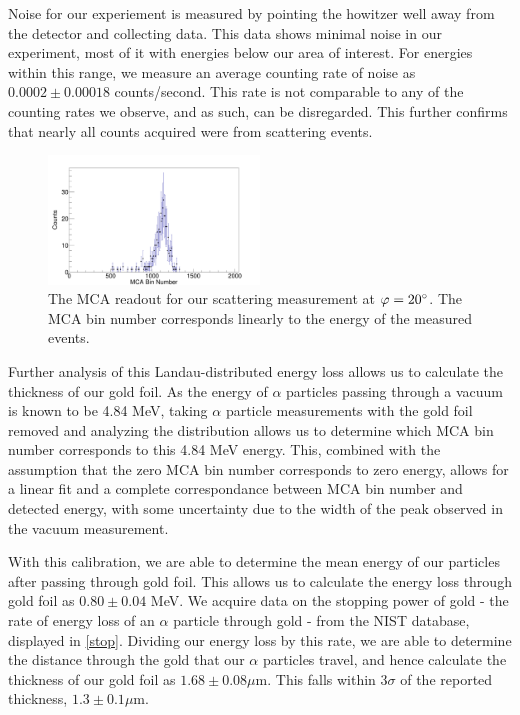    Noise for our experiement is measured by pointing the howitzer well away from the detector and collecting data. This data shows minimal noise in our experiment, most of it with energies below our area of interest. For energies within this range, we measure an average counting rate of noise as $0.0002 \pm 0.00018$ counts/second. This rate is not comparable to any of the counting rates we observe, and as such, can be disregarded. This further confirms that nearly all counts acquired were from scattering events.
   \begin{figure}[h]
     \includegraphics[width=0.5\textwidth]{mca_readout.png}
     \caption{The MCA readout for our scattering measurement at $\varphi = 20\degree$. The MCA bin number corresponds linearly to the energy of the measured events.}
     \label{mca}
   \end{figure}

   Further analysis of this Landau-distributed energy loss allows us to calculate the thickness of our gold foil. As the energy of $\alpha$ particles passing through a vacuum is known to be 4.84 MeV, taking $\alpha$ particle measurements with the gold foil removed and analyzing the distribution allows us to determine which MCA bin number corresponds to this 4.84 MeV  energy. This, combined with the assumption that the zero MCA bin number corresponds to zero energy, allows for a linear fit and a complete correspondance between MCA bin number and detected energy, with some uncertainty due to the width of the peak observed in the vacuum measurement. 

   With this calibration, we are able to determine the mean energy of our particles after passing through gold foil. This allows us to calculate the energy loss through gold foil as $0.80 \pm 0.04$ MeV. We acquire data on the stopping power of gold - the rate of energy loss of an $\alpha$ particle through gold - from the NIST database, displayed in \ref{stop}. Dividing our energy loss by this rate, we are able to determine the distance through the gold that our $\alpha$ particles travel, and hence calculate the thickness of our gold foil as $1.68 \pm 0.08 \mu$m. This falls within $3\sigma$ of the reported thickness, $1.3 \pm 0.1 \mu$m.

